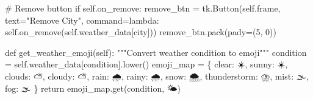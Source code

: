 \documentclass[
  letterpaper,
  DIV=11,
  numbers=noendperiod,
  oneside]{scrreprt}
\newenvironment{Shaded}{}{}
\newcommand{\CommentTok}[1]{\textcolor[rgb]{0.42,0.45,0.49}{#1}}
\newcommand{\ControlFlowTok}[1]{\textcolor[rgb]{0.84,0.23,0.29}{#1}}
\newcommand{\DecValTok}[1]{\textcolor[rgb]{0.00,0.36,0.77}{#1}}
\newcommand{\KeywordTok}[1]{\textcolor[rgb]{0.84,0.23,0.29}{#1}}
\newcommand{\NormalTok}[1]{\textcolor[rgb]{0.14,0.16,0.18}{#1}}
\newcommand{\OperatorTok}[1]{\textcolor[rgb]{0.14,0.16,0.18}{#1}}
\newcommand{\StringTok}[1]{\textcolor[rgb]{0.01,0.18,0.38}{#1}}
\newcommand{\VariableTok}[1]{\textcolor[rgb]{0.89,0.38,0.04}{#1}}
\begin{document}
\begin{Shaded}
\begin{Highlighting}[]
        \CommentTok{\# Remove button}
        \ControlFlowTok{if} \VariableTok{self}\NormalTok{.on\_remove:}
\NormalTok{            remove\_btn }\OperatorTok{=}\NormalTok{ tk.Button(}\VariableTok{self}\NormalTok{.frame, text}\OperatorTok{=}\StringTok{"Remove City"}\NormalTok{,}
\NormalTok{                                  command}\OperatorTok{=}\KeywordTok{lambda}\NormalTok{: }\VariableTok{self}\NormalTok{.on\_remove(}\VariableTok{self}\NormalTok{.weather\_data[}\StringTok{\textquotesingle{}city\textquotesingle{}}\NormalTok{]))}
\NormalTok{            remove\_btn.pack(pady}\OperatorTok{=}\NormalTok{(}\DecValTok{5}\NormalTok{, }\DecValTok{0}\NormalTok{))}
    
    \KeywordTok{def}\NormalTok{ get\_weather\_emoji(}\VariableTok{self}\NormalTok{):}
        \CommentTok{"""Convert weather condition to emoji"""}
\NormalTok{        condition }\OperatorTok{=} \VariableTok{self}\NormalTok{.weather\_data[}\StringTok{\textquotesingle{}condition\textquotesingle{}}\NormalTok{].lower()}
\NormalTok{        emoji\_map }\OperatorTok{=}\NormalTok{ \{}
            \StringTok{\textquotesingle{}clear\textquotesingle{}}\NormalTok{: }\StringTok{\textquotesingle{}☀️\textquotesingle{}}\NormalTok{,}
            \StringTok{\textquotesingle{}sunny\textquotesingle{}}\NormalTok{: }\StringTok{\textquotesingle{}☀️\textquotesingle{}}\NormalTok{, }
            \StringTok{\textquotesingle{}clouds\textquotesingle{}}\NormalTok{: }\StringTok{\textquotesingle{}⛅\textquotesingle{}}\NormalTok{,}
            \StringTok{\textquotesingle{}cloudy\textquotesingle{}}\NormalTok{: }\StringTok{\textquotesingle{}⛅\textquotesingle{}}\NormalTok{,}
            \StringTok{\textquotesingle{}rain\textquotesingle{}}\NormalTok{: }\StringTok{\textquotesingle{}🌧️\textquotesingle{}}\NormalTok{,}
            \StringTok{\textquotesingle{}rainy\textquotesingle{}}\NormalTok{: }\StringTok{\textquotesingle{}🌧️\textquotesingle{}}\NormalTok{,}
            \StringTok{\textquotesingle{}snow\textquotesingle{}}\NormalTok{: }\StringTok{\textquotesingle{}🌨️\textquotesingle{}}\NormalTok{,}
            \StringTok{\textquotesingle{}thunderstorm\textquotesingle{}}\NormalTok{: }\StringTok{\textquotesingle{}⛈️\textquotesingle{}}\NormalTok{,}
            \StringTok{\textquotesingle{}mist\textquotesingle{}}\NormalTok{: }\StringTok{\textquotesingle{}🌫️\textquotesingle{}}\NormalTok{,}
            \StringTok{\textquotesingle{}fog\textquotesingle{}}\NormalTok{: }\StringTok{\textquotesingle{}🌫️\textquotesingle{}}
\NormalTok{        \}}
        \ControlFlowTok{return}\NormalTok{ emoji\_map.get(condition, }\StringTok{\textquotesingle{}🌤️\textquotesingle{}}\NormalTok{)}
    

\end{Highlighting}
\end{Shaded}
\end{document}
